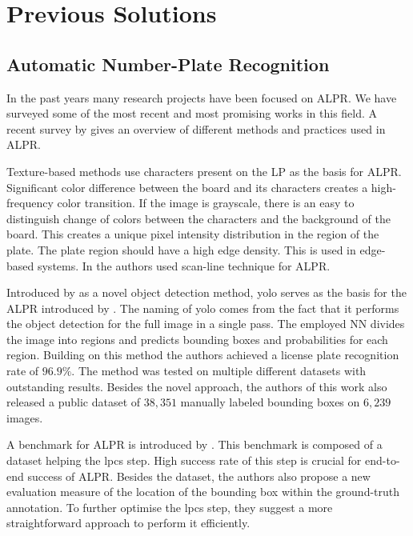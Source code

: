 \section{Previous Solutions}
\label{previous-solutions}

\subsection{Automatic Number-Plate Recognition}
\label{previous-solutions-anpr}
In the past years many research projects have been focused on \ac{ALPR}.
We have surveyed some of the most recent and most promising works in this field.
A recent survey by \cite{survOnMet} gives an overview of different methods and
practices used in \ac{ALPR}.

Texture-based methods use characters present on the \ac{LP} as the basis for
\ac{ALPR}. Significant color difference between the board and its characters
creates a high-frequency color transition. If the image is grayscale,
there is an easy to distinguish change of colors between the characters and the
background of the board. This creates a unique pixel intensity distribution in
the region of the plate. The plate region should have a high edge density. This
is used in edge-based systems. In \cite{HongFuJiaHuan} the authors used
scan-line technique for \ac{ALPR}.

Introduced by \cite{redmon2016look} as a novel object detection method,
\ac{yolo} serves as the basis for the \ac{ALPR} introduced by
\cite{DBLP:journals/corr/abs-1909-01754}.
The naming of \ac{yolo} comes from the fact that it performs the object detection
for the full image in a single pass. The employed \ac{NN} divides the image
into regions and predicts bounding boxes and probabilities for each region.
Building on this method the authors achieved a license plate recognition rate of
$96.9\%$.  The method was tested on multiple different datasets with outstanding
results.  Besides the novel approach, the authors of this work also released
a public dataset of $38,351$ manually labeled bounding boxes on $6,239$ images.

A benchmark for \ac{ALPR} is introduced by
\cite{DBLP:journals/corr/GoncalvesSMS16}. This benchmark is
composed of a dataset helping the \ac{lpcs} step. High success rate of this step
is crucial for end-to-end success of \ac{ALPR}. Besides the dataset, the authors
also propose a new evaluation measure of the location of the bounding
box within the ground-truth annotation. To further optimise the \ac{lpcs} step,
they suggest a more straightforward approach to perform it efficiently.

